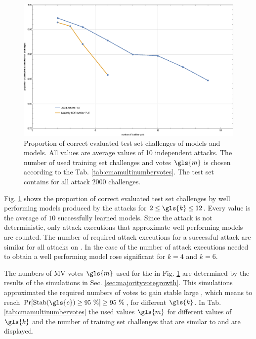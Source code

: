 \begin{figure}[ht]
\includegraphics[width=1.00\textwidth]{images/xor-cma-attack-performance.eps}
\caption[Proportion of correct evaluated test set challenges for \acs{XOR} Arbiter \puf models and Majority \acs{XOR} Arbiter \puf models]{Proportion of correct evaluated test set challenges of \xpuf models and \mxpuf models. All values are average values of 10 independent attacks. The number of used training set challenges and votes $\gls{m}$ is chosen according to the Tab. \ref{tab:cmamultinumbervotes}. The test set contains for all attack $2000$ challenges.}
\label{fig:cmamultiattackmodelperformance}
\end{figure}

Fig. \ref{fig:cmamultiattackmodelperformance} shows the proportion of correct evaluated test set challenges by well performing models produced by the attacks for $2 \le \gls{k} \le 12$.
Every value is the average of $10$ successfully learned models.
Since the attack is not deterministic, only attack executions that approximate well performing models are counted.
The number of required attack executions for a successful attack are similar for all attacks on \xpufs.
In the case of \mxpufs the number of attack executions needed to obtain a well performing model rose significant for $k = 4$ and $k = 6$.

The numbers of \ac{MV} votes $\gls{m}$ used for the \mxpufs in Fig. \ref{fig:cmamultiattackmodelperformance} are determined by the results of the simulations in Sec. \ref{sec:majorityvotegrowth}.
This simulations approximated the required numbers of votes to gain stable large \mxpufs, which means to reach $\Pr[\protect\Stab(\gls{c}) \ge 95\ \%] \ge 95\ \%$, for different $\gls{k}$.
In Tab. \ref{tab:cmamultinumbervotes} the used values $\gls{m}$ for different values of $\gls{k}$ and the number of training set challenges that are similar to \xpufs and \mxpufs are displayed.

